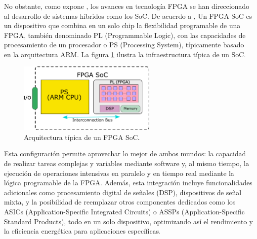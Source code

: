 \documentclass[]{book}
\begin{document}
\noindent No obstante, como expone \cite{bravo2020new}, los avances en tecnología FPGA se han direccionado al desarrollo de sistemas híbridos como los SoC. De acuerdo a \cite{amd_zynq_7000}, Un FPGA SoC es un dispositivo que combina en un solo chip la flexibilidad programable de una FPGA, también denominado PL (Programmable Logic), con las capacidades de procesamiento de un procesador o PS (Processing System), típicamente basado en la arquitectura ARM. La figura \ref{fig:fpga_soc} ilustra la infraestructura típica de un SoC. \\ 

\begin{figure}[h]
    \centering
    \includegraphics[width=0.6\textwidth]{FPGA_SoC.png}
    \caption{Arquitectura típica de un FPGA SoC.}
    \label{fig:fpga_soc}

\end{figure}

\noindent Esta configuración permite aprovechar lo mejor de ambos mundos: la capacidad de realizar tareas complejas y variables mediante software y, al mismo tiempo, la ejecución de operaciones intensivas en paralelo y en tiempo real mediante la lógica programable de la FPGA. Además, esta integración incluye funcionalidades adicionales como procesamiento digital de señales (DSP), dispositivos de señal mixta, y la posibilidad de reemplazar otros componentes dedicados como los ASICs (Application-Specific Integrated Circuits) o ASSPs (Application-Specific Standard Products), todo en un solo dispositivo, optimizando así el rendimiento y la eficiencia energética para aplicaciones específicas.\\


 
\end{document}
